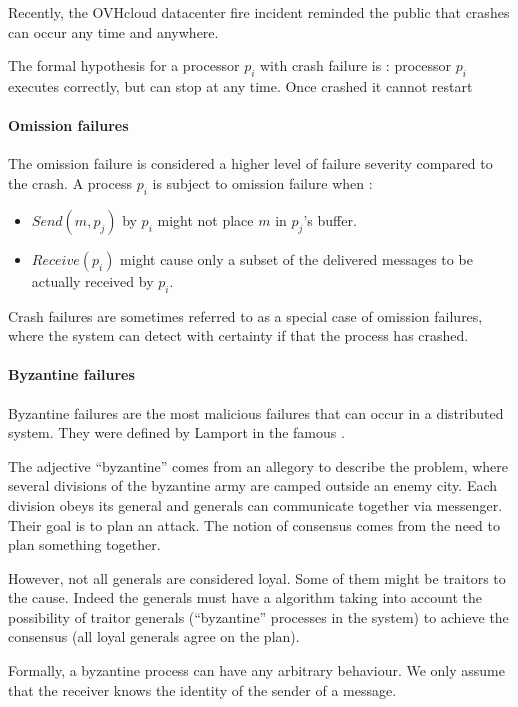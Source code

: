 \documentclass[11pt, twocolumn]{article}
\begin{document}
Recently, the OVHcloud datacenter fire incident reminded the public that crashes can occur any time and anywhere.

The formal hypothesis for a processor $p_i$ with crash failure is : processor $p_i$ executes correctly, but can stop at any time. Once crashed it cannot restart

\paragraph{Omission failures}

The omission failure is considered a higher level of failure severity compared to the crash.
A process $p_i$ is subject to omission failure when :
\begin{itemize}
    \item \(Send(m, p_j)\) by \(p_i\) might not place $m$ in \(p_j\)'s buffer.
    \item \(Receive(p_i)\) might cause only a subset of the delivered messages to be actually received by \(p_i\).
\end{itemize}

Crash failures are sometimes referred to as a special case of omission failures, where the system can detect with certainty if that the process has crashed.

\paragraph{Byzantine failures}
\label{subsec:byzantine}

Byzantine failures are the most malicious failures that can occur in a distributed system. They were defined by Lamport in the famous \cite{byzantine} .

The adjective “byzantine” comes from an allegory to describe the problem, where several divisions of the byzantine army are camped outside an enemy city. Each division obeys its general and generals can communicate together via messenger. Their goal is to plan an attack. The notion of consensus comes from the need to plan something together.

However, not all generals are considered loyal. Some of them might be traitors to the cause. Indeed the generals must have a algorithm taking into account the possibility of traitor generals (“byzantine” processes in the system) to achieve the consensus (all loyal generals agree on the plan).

Formally, a byzantine process can have any arbitrary behaviour. We only assume that the receiver knows the identity of the sender of a message.
\end{document}
